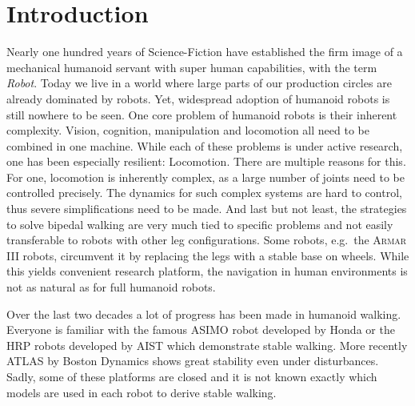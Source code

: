 \documentclass[english,ngerman]{KITreprt}
\newcommand{\name}[1]{\textsc{#1}}
\begin{document}



\maketitle

\tableofcontents

\chapter{Introduction}\label{introduction}

Nearly one hundred years of Science-Fiction have established the firm
image of a mechanical humanoid servant with super human capabilities,
with the term \emph{Robot}. Today we live in a world where large parts
of our production circles are already dominated by robots. Yet,
widespread adoption of humanoid robots is still nowhere to be seen. One
core problem of humanoid robots is their inherent complexity. Vision,
cognition, manipulation and locomotion all need to be combined in one
machine. While each of these problems is under active research, one has
been especially resilient: Locomotion. There are multiple reasons for
this. For one, locomotion is inherently complex, as a large number of
joints need to be controlled precisely. The dynamics for such complex
systems are hard to control, thus severe simplifications need to be
made. And last but not least, the strategies to solve bipedal walking
are very much tied to specific problems and not easily transferable to
robots with other leg configurations. Some robots, e.g.~the
\name{Armar III} robots, circumvent it by replacing the legs with a
stable base on wheels. While this yields convenient research platform,
the navigation in human environments is not as natural as for full
humanoid robots.

Over the last two decades a lot of progress has been made in humanoid
walking. Everyone is familiar with the famous \name{ASIMO} robot
developed by Honda or the \name{HRP} robots developed by \name{AIST}
which demonstrate stable walking. More recently \name{ATLAS} by Boston
Dynamics shows great stability even under disturbances. Sadly, some of
these platforms are closed and it is not known exactly which models are
used in each robot to derive stable walking.
\end{document}
